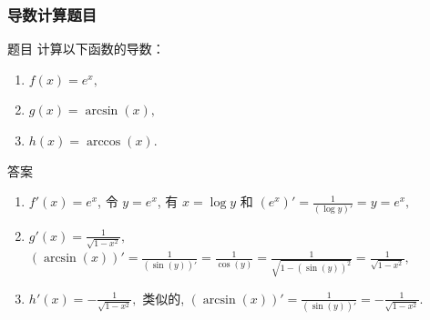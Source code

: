 \documentclass[
10pt,
aspectratio=43,
]{beamer}
\begin{document}
\begin{frame}
	\frametitle{导数计算题目}
			
	\begin{exampleblock}{题目}
		计算以下函数的导数：
		\begin{enumerate}
			\item $f(x) = e^x,$
			\item $g(x) = \arcsin(x),$
			\item $h(x) = \arccos(x).$
		\end{enumerate}
	\end{exampleblock}
			
	\pause
			
	\begin{exampleblock}{答案}
		\begin{enumerate}
			\item $f'(x) = e^x$, 令 $y=e^x$, 有 $x=\log y$ 和 $(e^x)'=\displaystyle\frac{1}{(\log y)'}=y=e^x,$
			\item $g'(x) = \displaystyle\frac{1}{\sqrt{1-x^2}},$ $(\arcsin(x))'=\displaystyle\frac{1}{(\sin (y))'}=\frac{1}{\cos(y)}=\frac{1}{\sqrt{1-(\sin(y))^2}}=\frac{1}{\sqrt{1-x^2}},$
			\item $h'(x) = -\displaystyle\frac{1}{\sqrt{1-x^2}},$ 类似的, $(\arcsin(x))'=\displaystyle\frac{1}{(\sin (y))'}=-\frac{1}{\sqrt{1-x^2}}.$
		\end{enumerate}
	\end{exampleblock}
\end{frame}
	
\end{document}

